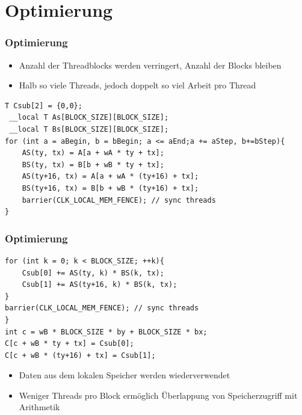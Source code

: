 \documentclass{beamer}
\begin{document}
\section{Optimierung}
\begin{frame}[fragile]
\frametitle{Optimierung}

\begin{itemize}
\item
Anzahl der Threadblocks werden verringert, Anzahl der Blocks bleiben
\item
Halb so viele Threads, jedoch doppelt so viel Arbeit pro Thread
\end{itemize}


\begin{lstlisting}[style=customc,caption=Optimized Code in OpenCL]
T Csub[2] = {0,0};
 __local T As[BLOCK_SIZE][BLOCK_SIZE]; 
 __local T Bs[BLOCK_SIZE][BLOCK_SIZE]; 
for (int a = aBegin, b = bBegin; a <= aEnd;a += aStep, b+=bStep){ 
	AS(ty, tx) = A[a + wA * ty + tx]; 
	BS(ty, tx) = B[b + wB * ty + tx]; 
	AS(ty+16, tx) = A[a + wA * (ty+16) + tx]; 
	BS(ty+16, tx) = B[b + wB * (ty+16) + tx]; 
	barrier(CLK_LOCAL_MEM_FENCE); // sync threads
}
\end{lstlisting}



\end{frame}


\begin{frame}[fragile]
\frametitle{Optimierung}
\begin{lstlisting}[style=customc,caption=innere Schleife und Output]
for (int k = 0; k < BLOCK_SIZE; ++k){ 
	Csub[0] += AS(ty, k) * BS(k, tx); 
	Csub[1] += AS(ty+16, k) * BS(k, tx); 
} 
barrier(CLK_LOCAL_MEM_FENCE); // sync threads
} 
int c = wB * BLOCK_SIZE * by + BLOCK_SIZE * bx; 
C[c + wB * ty + tx] = Csub[0]; 
C[c + wB * (ty+16) + tx] = Csub[1]; 
\end{lstlisting}

\begin{itemize}

\item
Daten aus dem lokalen Speicher werden wiederverwendet
\item 
Weniger Threads pro Block erm\"oglich \"Uberlappung von Speicherzugriff mit Arithmetik
\end{itemize}


\end{frame}
\end{document}
